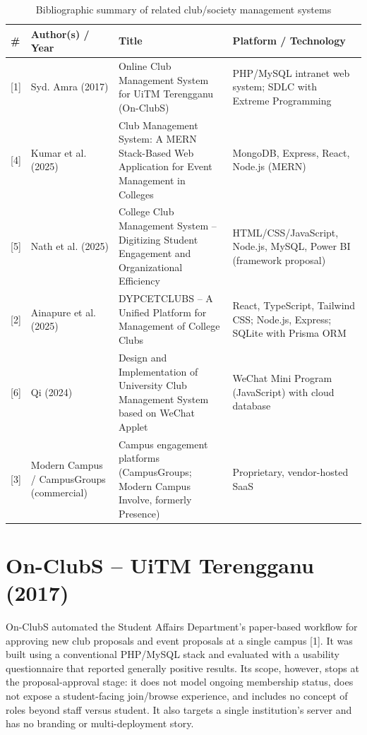 \documentclass[12pt,oneside]{book}
\begin{document}
\begin{table}[H]
\caption{Bibliographic summary of related club/society management systems}
\label{tab:2.1}
\centering
\small
\begin{tabularx}{\textwidth}{@{}L{0.5cm}L{3cm}L{5cm}>{\RaggedRight\arraybackslash}X@{}}
\toprule
\# & Author(s) / Year & Title & Platform / Technology \\
\midrule
{[1]} & Syd. Amra (2017) & Online Club Management System for UiTM Terengganu (On-ClubS) & PHP/MySQL intranet web system; SDLC with Extreme Programming \\
{[4]} & Kumar et al. (2025) & Club Management System: A MERN Stack-Based Web Application for Event Management in Colleges & MongoDB, Express, React, Node.js (MERN) \\
{[5]} & Nath et al. (2025) & College Club Management System -- Digitizing Student Engagement and Organizational Efficiency & HTML/CSS/JavaScript, Node.js, MySQL, Power BI (framework proposal) \\
{[2]} & Ainapure et al. (2025) & DYPCETCLUBS -- A Unified Platform for Management of College Clubs & React, TypeScript, Tailwind CSS; Node.js, Express; SQLite with Prisma ORM \\
{[6]} & Qi (2024) & Design and Implementation of University Club Management System based on WeChat Applet & WeChat Mini Program (JavaScript) with cloud database \\
{[3]} & Modern Campus / CampusGroups (commercial) & Campus engagement platforms (CampusGroups; Modern Campus Involve, formerly Presence) & Proprietary, vendor-hosted SaaS \\
\bottomrule
\end{tabularx}
\end{table}

\section{On-ClubS -- UiTM Terengganu (2017)}
On-ClubS automated the Student Affairs Department's paper-based workflow for approving new club proposals and event proposals at a single campus [1]. It was built using a conventional PHP/MySQL stack and evaluated with a usability questionnaire that reported generally positive results. Its scope, however, stops at the proposal-approval stage: it does not model ongoing membership status, does not expose a student-facing join/browse experience, and includes no concept of roles beyond staff versus student. It also targets a single institution's server and has no branding or multi-deployment story.
\end{document}
